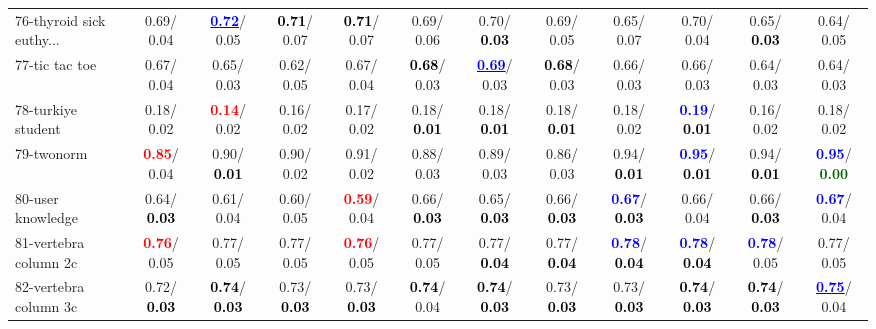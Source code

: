 \begin{table}[h]
\begin{center}
{\begin{tabular}{lc|c|c|c|c|c|c|c|c|c|c}
76-thyroid sick euthy... &   0.69/  0.04 & \underline{\textcolor{blue}{\textbf{  0.72}}}/  0.05 & \textcolor{black}{\textbf{  0.71}}/  0.07 & \textcolor{black}{\textbf{  0.71}}/  0.07 &   0.69/  0.06 &   0.70/\textcolor{black}{\textbf{  0.03}} &   0.69/  0.05 &   0.65/  0.07 &   0.70/  0.04 &   0.65/\textcolor{black}{\textbf{  0.03}} &   0.64/  0.05 \\
77-tic tac toe &   0.67/  0.04 &   0.65/  0.03 &   0.62/  0.05 &   0.67/  0.04 & \textcolor{black}{\textbf{  0.68}}/  0.03 & \underline{\textcolor{blue}{\textbf{  0.69}}}/  0.03 & \textcolor{black}{\textbf{  0.68}}/  0.03 &   0.66/  0.03 &   0.66/  0.03 &   0.64/  0.03 &   0.64/  0.03 \\
78-turkiye student &   0.18/  0.02 & \textcolor{red}{\textbf{  0.14}}/  0.02 &   0.16/  0.02 &   0.17/  0.02 &   0.18/\textcolor{black}{\textbf{  0.01}} &   0.18/\textcolor{black}{\textbf{  0.01}} &   0.18/\textcolor{black}{\textbf{  0.01}} &   0.18/  0.02 & \textcolor{blue}{\textbf{  0.19}}/\textcolor{black}{\textbf{  0.01}} &   0.16/  0.02 &   0.18/  0.02 \\ \hline
79-twonorm & \textcolor{red}{\textbf{  0.85}}/  0.04 &   0.90/\textcolor{black}{\textbf{  0.01}} &   0.90/  0.02 &   0.91/  0.02 &   0.88/  0.03 &   0.89/  0.03 &   0.86/  0.03 &   0.94/\textcolor{black}{\textbf{  0.01}} & \textcolor{blue}{\textbf{  0.95}}/\textcolor{black}{\textbf{  0.01}} &   0.94/\textcolor{black}{\textbf{  0.01}} & \textcolor{blue}{\textbf{  0.95}}/\textcolor{darkgreen}{\textbf{  0.00}} \\
80-user knowledge &   0.64/\textcolor{black}{\textbf{  0.03}} &   0.61/  0.04 &   0.60/  0.05 & \textcolor{red}{\textbf{  0.59}}/  0.04 &   0.66/\textcolor{black}{\textbf{  0.03}} &   0.65/\textcolor{black}{\textbf{  0.03}} &   0.66/\textcolor{black}{\textbf{  0.03}} & \textcolor{blue}{\textbf{  0.67}}/\textcolor{black}{\textbf{  0.03}} &   0.66/  0.04 &   0.66/\textcolor{black}{\textbf{  0.03}} & \textcolor{blue}{\textbf{  0.67}}/  0.04 \\
81-vertebra column 2c & \textcolor{red}{\textbf{  0.76}}/  0.05 &   0.77/  0.05 &   0.77/  0.05 & \textcolor{red}{\textbf{  0.76}}/  0.05 &   0.77/  0.05 &   0.77/\textcolor{black}{\textbf{  0.04}} &   0.77/\textcolor{black}{\textbf{  0.04}} & \textcolor{blue}{\textbf{  0.78}}/\textcolor{black}{\textbf{  0.04}} & \textcolor{blue}{\textbf{  0.78}}/\textcolor{black}{\textbf{  0.04}} & \textcolor{blue}{\textbf{  0.78}}/  0.05 &   0.77/  0.05 \\
82-vertebra column 3c &   0.72/\textcolor{black}{\textbf{  0.03}} & \textcolor{black}{\textbf{  0.74}}/\textcolor{black}{\textbf{  0.03}} &   0.73/\textcolor{black}{\textbf{  0.03}} &   0.73/\textcolor{black}{\textbf{  0.03}} & \textcolor{black}{\textbf{  0.74}}/  0.04 & \textcolor{black}{\textbf{  0.74}}/\textcolor{black}{\textbf{  0.03}} &   0.73/\textcolor{black}{\textbf{  0.03}} &   0.73/\textcolor{black}{\textbf{  0.03}} & \textcolor{black}{\textbf{  0.74}}/\textcolor{black}{\textbf{  0.03}} & \textcolor{black}{\textbf{  0.74}}/\textcolor{black}{\textbf{  0.03}} & \underline{\textcolor{blue}{\textbf{  0.75}}}/  0.04 \\

\end{tabular}}
\end{center}
\end{table}

